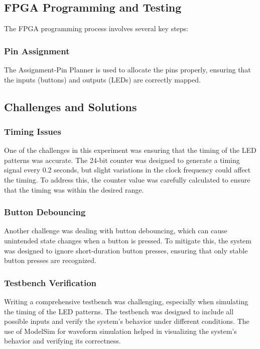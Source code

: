 \documentclass[]{article}
\begin{document}
\subsection{FPGA Programming and Testing}

The FPGA programming process involves several key steps:

\subsubsection{Pin Assignment}
The Assignment-Pin Planner is used to allocate the pins properly, ensuring that the inputs (buttons) and outputs (LEDs) are correctly mapped.

\subsection{Challenges and Solutions}

\subsubsection{Timing Issues}
One of the challenges in this experiment was ensuring that the timing of the LED patterns was accurate. The 24-bit counter was designed to generate a timing signal every 0.2 seconds, but slight variations in the clock frequency could affect the timing. To address this, the counter value was carefully calculated to ensure that the timing was within the desired range.

\subsubsection{Button Debouncing}
Another challenge was dealing with button debouncing, which can cause unintended state changes when a button is pressed. To mitigate this, the system was designed to ignore short-duration button presses, ensuring that only stable button presses are recognized.

\subsubsection{Testbench Verification}
Writing a comprehensive testbench was challenging, especially when simulating the timing of the LED patterns. The testbench was designed to include all possible inputs and verify the system's behavior under different conditions. The use of ModelSim for waveform simulation helped in visualizing the system's behavior and verifying its correctness.
\end{document}
